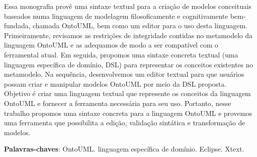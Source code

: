\documentclass[
	10pt,				%
	oneside,
	a4paper,			%
	brazil,
	english
	]{abntex2}
\begin{document}
\begin{agradecimentos}
%
\end{agradecimentos}



\setlength{\absparsep}{18pt} %
\begin{resumo}
 Essa monografia provê uma sintaxe textual para a criação de modelos conceituais
 baseados numa linguagem de modelagem filosoficamente e cognitivamente bem-fundada,
 chamada OntoUML, bem como um editor para o uso desta linguagem.
%
 Primeiramente, revisamos as restrições de integridade contidas no metamodelo
 da linguagem OntoUML e as adequamos de modo a ser compatível com o ferramental atual.
%
 Em seguida, propomos uma sintaxe concreta textual (uma linguagem específica de domínio, DSL)
 para representar os conceitos existentes no metamodelo.
%
 Na sequência, desenvolvemos um editor textual para que usuários possam criar e
 manipular modelos OntoUML por meio da DSL proposta.
%
 Objetivo é criar uma linguagem textual que represente os conceitos da linguagem
 OntoUML e fornecer a ferramenta necessária para seu uso.
%
 Portanto, nesse trabalho propomos uma sintaxe concreta para a linguagem OntoUML
 e provemos uma ferramenta que possibilita a edição, validação sintática e
 transformação de modelos.
%

 \textbf{Palavras-chaves}: OntoUML. linguagem específica de domínio. Eclipse. Xtext.
\end{resumo}
\end{document}

